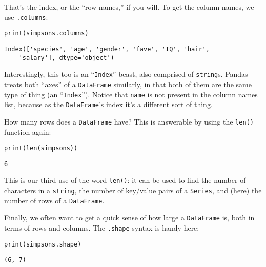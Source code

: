 That's the index, or the ``row names,'' if you will. To get the column names,
we use \texttt{.columns}:

\begin{Verbatim}[fontsize=\small,samepage=true,frame=single,framesep=3mm]
print(simpsons.columns)
\end{Verbatim}
\vspace{-.2in}

\begin{Verbatim}[fontsize=\small,samepage=true,frame=leftline,framesep=5mm,framerule=1mm]
Index(['species', 'age', 'gender', 'fave', 'IQ', 'hair',
    'salary'], dtype='object')
\end{Verbatim}

Interestingly, this too is an ``\texttt{Index}'' beast, also comprised of
\texttt{string}s. Pandas treats both ``axes'' of a \texttt{DataFrame}
similarly, in that both of them are the same type of thing (an
``\texttt{Index}''). Notice that \texttt{name} is not present in the column
names list, because as the \texttt{DataFrame}'s index it's a different sort of
thing.


How many rows does a \texttt{DataFrame} have? This is answerable by using the
\texttt{len()} function again:

\begin{Verbatim}[fontsize=\small,samepage=true,frame=single,framesep=3mm]
print(len(simpsons))
\end{Verbatim}
\vspace{-.2in}

\begin{Verbatim}[fontsize=\small,samepage=true,frame=leftline,framesep=5mm,framerule=1mm]
6
\end{Verbatim}

This is our third use of the word \texttt{len()}: it can be used to find the
number of characters in a \texttt{string}, the number of key/value pairs of a
\texttt{Series}, and (here) the number of rows of a \texttt{DataFrame}.

Finally, we often want to get a quick sense of how large a \texttt{DataFrame}
is, both in terms of rows and columns. The \texttt{.shape} syntax is handy
here:

\begin{samepage}
\begin{Verbatim}[fontsize=\small,samepage=true,frame=single,framesep=3mm]
print(simpsons.shape)
\end{Verbatim}
\vspace{-.2in}

\begin{Verbatim}[fontsize=\small,samepage=true,frame=leftline,framesep=5mm,framerule=1mm]
(6, 7)
\end{Verbatim}
\end{samepage}

